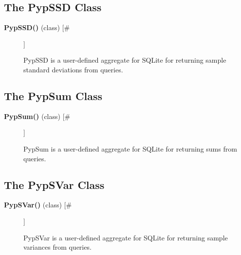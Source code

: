 \documentclass{article}
\begin{document}
\subsection*{The PypSSD Class}
\begin{description}
\item[\textbf{PypSSD()} (class) [\#]
]
\par PypSSD is a user-defined aggregate for SQLite for returning sample standard deviations
from queries.

\end{description}
\subsection*{The PypSum Class}
\begin{description}
\item[\textbf{PypSum()} (class) [\#]
]
\par PypSum is a user-defined aggregate for SQLite for returning sums from queries.

\end{description}
\subsection*{The PypSVar Class}
\begin{description}
\item[\textbf{PypSVar()} (class) [\#]
]
\par PypSVar is a user-defined aggregate for SQLite for returning sample variances
from queries.

\end{description}
\end{document}
